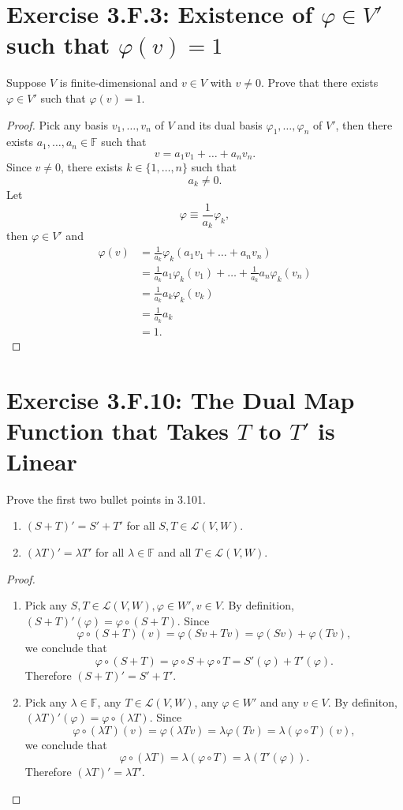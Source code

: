 \section{Exercise 3.F.3: Existence of $\varphi\in V'$ such that $\varphi(v)=1$}
Suppose $V$ is finite-dimensional and $v\in V$ with $v\ne 0$. Prove that there exists $\varphi\in V'$ such that $\varphi(v)=1$.
\begin{proof}
Pick any basis $v_1,\dots,v_n$ of $V$ and its dual basis $\varphi_1,\dots,\varphi_n$ of $V'$, then there exists $a_1,\dots,a_n\in\mathbb{F}$ such that\[
v=a_1v_1+\dots+a_nv_n.
\]Since $v\ne 0$, there exists $k\in\{1,\dots,n\}$ such that\[
a_k\ne 0.
\]Let\[
\varphi\equiv\frac{1}{a_k}\varphi_k,
\]then $\varphi\in V'$ and \[
\begin{split}
\varphi(v)&=\frac{1}{a_k}\varphi_k(a_1v_1+\dots+a_nv_n)\\
&=\frac{1}{a_k}a_1\varphi_k(v_1)+\dots+\frac{1}{a_k}a_n\varphi_k(v_n)\\
&=\frac{1}{a_k}a_k\varphi_k(v_k)\\
&=\frac{1}{a_k}a_k\\
&=1.
\end{split}
\]
\end{proof}
\section{Exercise 3.F.10: The Dual Map Function that Takes $T$ to $T'$ is Linear}
Prove the first two bullet points in 3.101.
\begin{enumerate}
\item $(S+T)'=S'+T'$ for all $S,T\in\mathcal{L}(V,W)$.
\item $(\lambda T)'=\lambda T'$ for all $\lambda\in\mathbb{F}$ and all $T\in\mathcal{L}(V,W)$.
\end{enumerate}
\begin{proof}
\begin{enumerate}
\item Pick any $S,T\in\mathcal{L}(V,W),\varphi\in W',v\in V$. By definition, $(S+T)'(\varphi)=\varphi\circ(S+T)$. Since\[
\varphi\circ(S+T)(v)=\varphi(Sv+Tv)=\varphi(Sv)+\varphi(Tv),
\]we conclude that\[
\varphi\circ(S+T)=\varphi\circ S+\varphi\circ T=S'(\varphi)+T'(\varphi).
\]Therefore $(S+T)'=S'+T'$.
\item Pick any $\lambda\in\mathbb{F}$, any $T\in\mathcal{L}(V,W)$, any $\varphi\in W'$ and any $v\in V$. By definiton, $(\lambda T)'(\varphi)=\varphi\circ(\lambda T)$. Since\[
\varphi\circ(\lambda T)(v)=\varphi(\lambda Tv)=\lambda\varphi(Tv)=\lambda(\varphi\circ T)(v),
\]we conclude that\[
\varphi\circ(\lambda T)=\lambda(\varphi\circ T)=\lambda(T'(\varphi)).
\]Therefore $(\lambda T)'=\lambda T'$.
\end{enumerate}
\end{proof}
